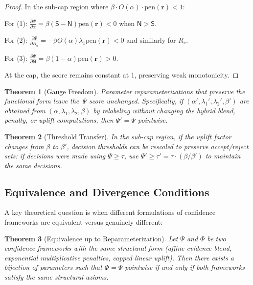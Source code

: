 \documentclass[12pt,a4paper]{article}
\newtheorem{theorem}{Theorem}
\newcommand{\Ssig}{\mathsf{S}}
\newcommand{\Nsig}{\mathsf{N}}
\newcommand{\alloc}{\alpha}
\newcommand{\riskvec}{\mathbf{r}}
\newcommand{\rA}{R_a}
\newcommand{\rV}{R_v}
\newcommand{\lA}{\lambda_1}
\newcommand{\lV}{\lambda_2}
\newcommand{\uplift}{\beta}
\newcommand{\pen}{\mathrm{pen}}
\newcommand{\blend}{O}
\newcommand{\score}{\Psi}
\begin{document}
\begin{proof}
In the sub-cap region where $\uplift \cdot \blend(\alloc) \cdot \pen(\riskvec) < 1$:

For (1): $\frac{\partial \score}{\partial \alloc} = \uplift (\Ssig - \Nsig) \pen(\riskvec) < 0$ when $\Nsig > \Ssig$.

For (2): $\frac{\partial \score}{\partial \rA} = -\uplift \blend(\alloc) \lA \pen(\riskvec) < 0$ and similarly for $\rV$.

For (3): $\frac{\partial \score}{\partial \Nsig} = \uplift (1-\alloc) \pen(\riskvec) > 0$.

At the cap, the score remains constant at 1, preserving weak monotonicity.
\end{proof}

\begin{theorem}[Gauge Freedom]
\label{thm:gauge-freedom}
Parameter reparameterizations that preserve the functional form leave the Ψ score unchanged. Specifically, if $(\alloc', \lA', \lV', \uplift')$ are obtained from $(\alloc, \lA, \lV, \uplift)$ by relabeling without changing the hybrid blend, penalty, or uplift computations, then $\score' = \score$ pointwise.
\end{theorem}

\begin{theorem}[Threshold Transfer]
\label{thm:threshold-transfer}
In the sub-cap region, if the uplift factor changes from $\uplift$ to $\uplift'$, decision thresholds can be rescaled to preserve accept/reject sets: if decisions were made using $\score \geq \tau$, use $\score' \geq \tau' = \tau \cdot (\uplift/\uplift')$ to maintain the same decisions.
\end{theorem}

\subsection{Equivalence and Divergence Conditions}

A key theoretical question is when different formulations of confidence frameworks are equivalent versus genuinely different:

\begin{theorem}[Equivalence up to Reparameterization]
\label{thm:equivalence}
Let $\score$ and $\Phi$ be two confidence frameworks with the same structural form (affine evidence blend, exponential multiplicative penalties, capped linear uplift). Then there exists a bijection of parameters such that $\Phi = \score$ pointwise if and only if both frameworks satisfy the same structural axioms.
\end{theorem}
\end{document}
